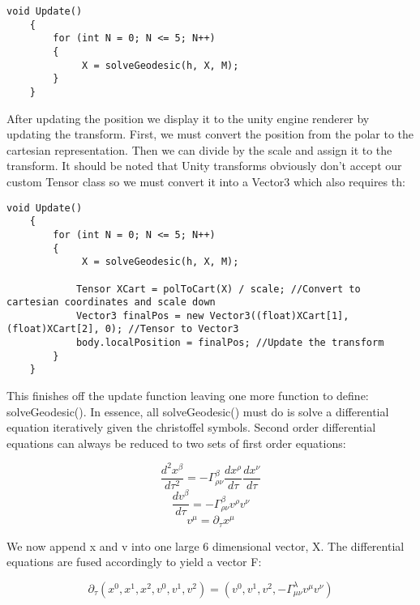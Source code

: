 \documentclass{article}
\begin{document}
\begin{verbatim}
void Update()
    {
        for (int N = 0; N <= 5; N++)
        {
             X = solveGeodesic(h, X, M);
        }
    }
\end{verbatim}

After updating the position we display it to the unity engine renderer by updating the transform. First, we must convert the position from the polar to the cartesian representation. Then we can divide by the scale and assign it to the transform. It should be noted that Unity transforms obviously don't accept our custom Tensor class so we must convert it into a Vector3 which also requires th:

\begin{verbatim}
void Update()
    {
        for (int N = 0; N <= 5; N++)
        {
             X = solveGeodesic(h, X, M);

            Tensor XCart = polToCart(X) / scale; //Convert to cartesian coordinates and scale down
            Vector3 finalPos = new Vector3((float)XCart[1], (float)XCart[2], 0); //Tensor to Vector3
            body.localPosition = finalPos; //Update the transform
        }
    }
\end{verbatim}

This finishes off the update function leaving one more function to define: solveGeodesic(). In essence, all solveGeodesic() must do is solve a differential equation iteratively given the christoffel symbols. Second order differential equations can always be reduced to two sets of first order equations:


\begin{equation*}
  \frac{d^2 x^{\beta}}{d \tau^2} = - \Gamma^\beta_{\rho \nu} \frac{dx^\rho}{d \tau} \frac{dx^\nu}{d \tau}
\end{equation*}
\begin{equation*}
  \frac{dv^\beta}{d\tau} = - \Gamma^\beta_{\rho \nu} v^\rho v^\nu
\end{equation*}
\begin{equation*}
  v^\mu=\partial_\tau x^\mu 
\end{equation*}

We now append x and v into one large 6 dimensional vector, X. The differential equations are fused accordingly to yield a vector F:

\begin{equation*}
  \partial_\tau (x^0, x^1, x^2, v^0, v^1, v^2) = (v^0, v^1, v^2, - \Gamma^\lambda_{\mu \nu} v^\mu v^\nu)
\end{equation*}
\end{document}
